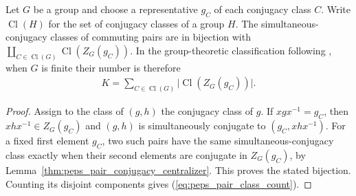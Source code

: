 \begin{lemma}%
    \label{thm:peps_pair_centralizer_count}
    \leanok
    Let $G$ be a group and choose a representative $g_C$ of each
    conjugacy class $C$. Write $\operatorname{Cl}(H)$ for the set of
    conjugacy classes of a group $H$. The simultaneous-conjugacy classes
    of commuting pairs are in bijection with
    $\coprod_{C\in\operatorname{Cl}(G)}\operatorname{Cl}(Z_G(g_C))$.
    In the group-theoretic classification following
    \cite[Theorem~5.9]{Schuch2010PEPS}, when $G$ is finite their number is
    therefore
    \begin{align}
        K=\sum_{C\in\operatorname{Cl}(G)}
        \bigl|\operatorname{Cl}(Z_G(g_C))\bigr|.
        \label{eq:peps_pair_class_count}
    \end{align}
\end{lemma}

\begin{proof}\leanok
    Assign to the class of $(g,h)$ the conjugacy class of $g$.
    If $xgx^{-1}=g_C$, then $xhx^{-1}\in Z_G(g_C)$ and
    $(g,h)$ is simultaneously conjugate to $(g_C,xhx^{-1})$.
    For a fixed first element $g_C$, two such pairs have the same
    simultaneous-conjugacy class exactly when their second elements
    are conjugate in $Z_G(g_C)$, by
    Lemma~\ref{thm:peps_pair_conjugacy_centralizer}.
    This proves the stated bijection. Counting its disjoint components
    gives (\ref{eq:peps_pair_class_count}).
\end{proof}


